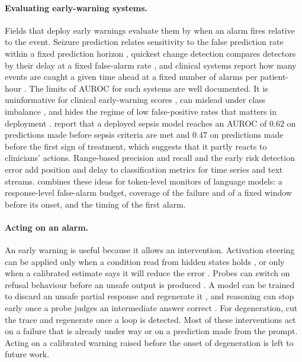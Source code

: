 \paragraph{Evaluating early-warning systems.}
Fields that deploy early warnings evaluate them by when an alarm fires relative
to the event. Seizure prediction relates sensitivity to the false prediction
rate within a fixed prediction horizon \citep{winterhalder2003seizure}, quickest
change detection compares detectors by their delay at a fixed false-alarm rate
\citep{basseville1993detection}, and clinical systems report how many events
are caught a given time ahead at a fixed number of alarms per patient-hour
\citep{hyland2020circulatory}. The limits of AUROC for such systems are well
documented. It is uninformative for clinical early-warning scores
\citep{romerobrufau2015cstatistic}, can mislead under class imbalance
\citep{saito2015precision}, and hides the regime of low false-positive rates
that matters in deployment \citep{carlini2022membership}.
\citet{kamran2024sepsis} report that a deployed sepsis model reaches an AUROC
of $0.62$ on predictions made before sepsis criteria are met and $0.47$ on
predictions made before the first sign of treatment, which suggests that it
partly reacts to clinicians' actions. Range-based precision and
recall \citep{tatbul2018precision} and the early risk detection error
\citep{losada2016test} add position and delay to classification metrics for
time series and text streams. \method{} combines these ideas for token-level
monitors of language models: a response-level false-alarm budget, coverage of
the failure and of a fixed window before its onset, and the timing of the first
alarm.

\paragraph{Acting on an alarm.}
An early warning is useful because it allows an intervention. Activation
steering can be applied only when a condition read from hidden states holds
\citep{lee2025cast}, or only when a calibrated estimate says it will reduce the
error \citep{hedstrom2025mera}. Probes can switch on refusal behaviour before
an unsafe output is produced \citep{han2025safeswitch}. A model can be trained
to discard an unsafe partial response and regenerate it
\citep{zhang2025backtracking}, and reasoning can stop early once a probe judges
an intermediate answer correct \citep{zhang2025reasoning}. For degeneration,
\citet{xie2025wordsalad} cut the trace and regenerate once a loop is detected.
Most of these interventions act on a failure that is already under way or on
a prediction made from the prompt. Acting on a calibrated warning raised before
the onset of degeneration is left to future work.

